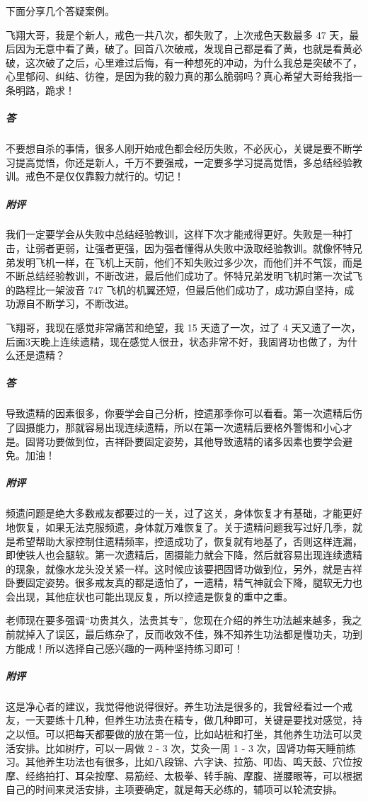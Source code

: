 下面分享几个答疑案例。

\begin{case}
    飞翔大哥，我是个新人，戒色一共八次，都失败了，上次戒色天数最多 47 天，最后因为无意中看了黄，破了。回首八次破戒，发现自己都是看了黄，也就是看黄必破，这次破了之后，心里难过后悔，有一种想死的冲动，为什么我总是突破不了，心里郁闷、纠结、彷徨，是因为我的毅力真的那么脆弱吗？真心希望大哥给我指一条明路，跪求！
    \subparagraph{答} 不要想自杀的事情，很多人刚开始戒色都会经历失败，不必灰心，关键是要不断学习提高觉悟，你还是新人，千万不要强戒，一定要多学习提高觉悟，多总结经验教训。戒色不是仅仅靠毅力就行的。切记！
    \subparagraph{附评} 我们一定要学会从失败中总结经验教训，这样下次才能戒得更好。失败是一种打击，让弱者更弱，让强者更强，因为强者懂得从失败中汲取经验教训。就像怀特兄弟发明飞机一样，在飞机上天前，他们不知失败过多少次，而他们并不气馁，而是不断总结经验教训，不断改进，最后他们成功了。怀特兄弟发明飞机时第一次试飞的路程比一架波音 747 飞机的机翼还短，但最后他们成功了，成功源自坚持，成功源自不断学习，不断改进。
\end{case}

\begin{case}
    飞翔哥，我现在感觉非常痛苦和绝望，我 15 天遗了一次，过了 4 天又遗了一次，后面3天晚上连续遗精，现在感觉人很丑，状态非常不好，我固肾功也做了，为什么还是遗精？
    \subparagraph{答} 导致遗精的因素很多，你要学会自己分析，控遗那季你可以看看。第一次遗精后伤了固摄能力，那就容易出现连续遗精，所以在第一次遗精后要格外警惕和小心才是。固肾功要做到位，吉祥卧要固定姿势，其他导致遗精的诸多因素也要学会避免。加油！
    \subparagraph{附评} 频遗问题是绝大多数戒友都要过的一关，过了这关，身体恢复才有基础，才能更好地恢复，如果无法克服频遗，身体就万难恢复了。关于遗精问题我写过好几季，就是希望帮助大家控制住遗精频率，控遗成功了，恢复就有地基了，否则这样连漏，即使铁人也会腿软。第一次遗精后，固摄能力就会下降，然后就容易出现连续遗精的现象，就像水龙头没关紧一样。这时候应该要把固肾功做到位，另外，就是吉祥卧要固定姿势。很多戒友真的都是遗怕了，一遗精，精气神就会下降，腿软无力也会出现，其他症状也可能出现反复，所以控遗是恢复的重中之重。
\end{case}

\begin{case}
    老师现在要多强调“功贵其久，法贵其专”，您现在介绍的养生功法越来越多，我之前就掉入了误区，最后练杂了，反而收效不佳，殊不知养生功法都是慢功夫，功到方能成！所以选择自己感兴趣的一两种坚持练习即可！
    \subparagraph{附评} 这是净心者的建议，我觉得他说得很好。养生功法是很多的，我曾经看过一个戒友，一天要练十几种，但养生功法贵在精专，做几种即可，关键是要找对感觉，持之以恒。可以把每天都要做的放在第一位，比如站桩和打坐，其他养生功法可以灵活安排。比如树疗，可以一周做 2 - 3 次，艾灸一周 1 - 3 次，固肾功每天睡前练习。其他养生功法也有很多，比如八段锦、六字诀、拉筋、叩齿、鸣天鼓、穴位按摩、经络拍打、耳朵按摩、易筋经、太极拳、转手腕、摩腹、搓腰眼等，可以根据自己的时间来灵活安排，主项要确定，就是每天必练的，辅项可以轮流安排。
\end{case}

